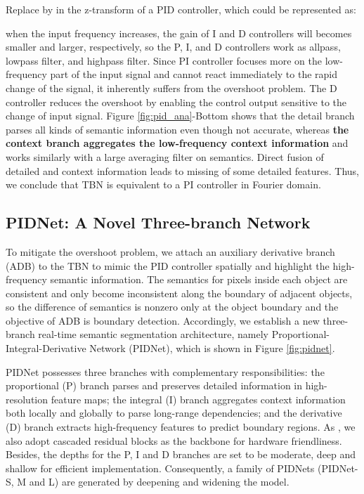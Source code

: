 \documentclass[10pt,twocolumn,letterpaper]{article}
\begin{document}
Replace  by  in the z-transform of a PID controller, which could be represented as:
 
when the input frequency  increases, the gain of I and D controllers will becomes smaller and larger, respectively, so the P, I, and D controllers work as allpass, lowpass filter, and highpass filter. Since PI controller focuses more on the low-frequency part of the input signal and cannot react immediately to the rapid change of the signal, it inherently suffers from the overshoot problem. The D controller reduces the overshoot by enabling the control output sensitive to the change of input signal. Figure \ref{fig:pid_ana}-Bottom shows that the detail branch parses all kinds of semantic information even though not accurate, whereas \textbf{the context branch aggregates the low-frequency context information} and works similarly with a large averaging filter on semantics. Direct fusion of detailed and context information leads to missing of some detailed features. Thus, we conclude that TBN is equivalent to a PI controller in Fourier domain.


\subsection{PIDNet: A Novel Three-branch Network} 
To mitigate the overshoot problem, we attach an auxiliary derivative branch (ADB) to the TBN to mimic the PID controller spatially and highlight the high-frequency semantic information. 
The semantics for pixels inside each object are consistent and only become inconsistent along the boundary of adjacent objects, so the difference of semantics is nonzero only at the object boundary and the objective of ADB is boundary detection. Accordingly, we establish a new three-branch real-time semantic segmentation architecture, namely Proportional-Integral-Derivative Network (PIDNet), which is shown in Figure \ref{fig:pidnet}. 

PIDNet possesses three branches with complementary responsibilities: the proportional (P) branch parses and preserves detailed information in high-resolution feature maps; the integral (I) branch aggregates context information both locally and globally to parse long-range dependencies; and the derivative (D) branch extracts high-frequency features to predict boundary regions. 
As \cite{ddrnet}, we also adopt cascaded residual blocks \cite{resnet} as the backbone for hardware friendliness. 
Besides, the depths for the P, I and D branches are set to be moderate, deep and shallow for efficient implementation. Consequently, a family of PIDNets (PIDNet-S, M and L) are generated by deepening and widening the model.
\end{document}
